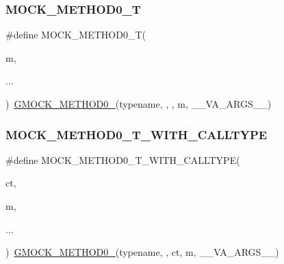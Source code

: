 \mbox{\label{_obj__test_2lib_2googletest-master_2googlemock_2include_2gmock_2gmock-generated-function-mockers_8h_a55a5a1a22cec416ead5605a2da39eec8}} 
\subsubsection{\texorpdfstring{MOCK\_METHOD0\_T}{MOCK\_METHOD0\_T}}
{\footnotesize\ttfamily \#define M\+O\+C\+K\+\_\+\+M\+E\+T\+H\+O\+D0\+\_\+T(\begin{DoxyParamCaption}\item[{}]{m,  }\item[{}]{... }\end{DoxyParamCaption})~\mbox{\hyperlink{_obj__test_2lib_2googletest-release-1_88_81_2googlemock_2include_2gmock_2gmock-generated-function-mockers_8h_ae0d290ffa58d7c624b2e3487ba1252f4}{G\+M\+O\+C\+K\+\_\+\+M\+E\+T\+H\+O\+D0\+\_\+}}(typename, , , m, \+\_\+\+\_\+\+V\+A\+\_\+\+A\+R\+G\+S\+\_\+\+\_\+)}

\mbox{\label{_obj__test_2lib_2googletest-master_2googlemock_2include_2gmock_2gmock-generated-function-mockers_8h_a68a3dcece1b6932b4dbda2216ff4fa90}} 
\subsubsection{\texorpdfstring{MOCK\_METHOD0\_T\_WITH\_CALLTYPE}{MOCK\_METHOD0\_T\_WITH\_CALLTYPE}}
{\footnotesize\ttfamily \#define M\+O\+C\+K\+\_\+\+M\+E\+T\+H\+O\+D0\+\_\+\+T\+\_\+\+W\+I\+T\+H\+\_\+\+C\+A\+L\+L\+T\+Y\+PE(\begin{DoxyParamCaption}\item[{}]{ct,  }\item[{}]{m,  }\item[{}]{... }\end{DoxyParamCaption})~\mbox{\hyperlink{_obj__test_2lib_2googletest-release-1_88_81_2googlemock_2include_2gmock_2gmock-generated-function-mockers_8h_ae0d290ffa58d7c624b2e3487ba1252f4}{G\+M\+O\+C\+K\+\_\+\+M\+E\+T\+H\+O\+D0\+\_\+}}(typename, , ct, m, \+\_\+\+\_\+\+V\+A\+\_\+\+A\+R\+G\+S\+\_\+\+\_\+)}

